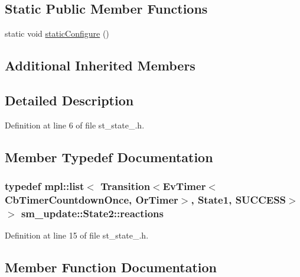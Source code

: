 \subsection*{Static Public Member Functions}
\begin{DoxyCompactItemize}
\item 
static void \hyperlink{structsm__update_1_1State2_a67d763dee03bc1de8fc52bb36d001415}{static\+Configure} ()
\end{DoxyCompactItemize}
\subsection*{Additional Inherited Members}


\subsection{Detailed Description}


Definition at line 6 of file st\+\_\+state\+\_.\+h.



\subsection{Member Typedef Documentation}
\subsubsection[{\texorpdfstring{reactions}{reactions}}]{\setlength{\rightskip}{0pt plus 5cm}typedef mpl\+::list$<$ Transition$<${\bf Ev\+Timer}$<${\bf Cb\+Timer\+Countdown\+Once}, {\bf Or\+Timer}$>$, {\bf State1}, {\bf S\+U\+C\+C\+E\+SS}$>$ $>$ {\bf sm\+\_\+update\+::\+State2\+::reactions}}\hypertarget{structsm__update_1_1State2_a6030dbce2602c3a49aae0a372e46e4df}{}\label{structsm__update_1_1State2_a6030dbce2602c3a49aae0a372e46e4df}


Definition at line 15 of file st\+\_\+state\+\_.\+h.



\subsection{Member Function Documentation}
